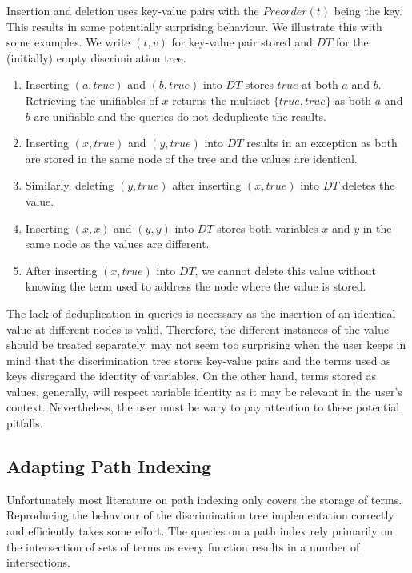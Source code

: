 Insertion and deletion uses key-value pairs with the $Preorder(t)$ being the key. This results in some potentially surprising behaviour. We illustrate this with some examples. We write $(t, v)$ for key-value pair stored and $DT$ for the (initially) empty discrimination tree.

\begin{enumerate}
  \item \label{cave1} Inserting $(a,true)$ and $(b,true)$ into $DT$ stores $true$ at both $a$ and $b$. Retrieving the unifiables of $x$ returns the multiset $\{true, true\}$ as both $a$ and $b$ are unifiable and the queries do not deduplicate the results.
  \item \label{cave2} Inserting $(x,true)$ and $(y,true)$ into $DT$ results in an exception as both are stored in the same node of the tree and the values are identical.
  \item \label{cave4} Similarly, deleting $(y,true)$ after inserting $(x,true)$ into $DT$ deletes the value.
  \item \label{cave3} Inserting $(x,x)$ and $(y,y)$ into $DT$ stores both variables $x$ and $y$ in the same node as the values are different.
  \item \label{cave5} After inserting $(x,true)$ into $DT$, we cannot delete this value without knowing the term used to address the node where the value is stored.
\end{enumerate}

The lack of deduplication in queries is necessary as the insertion of an identical value at different nodes is valid. Therefore, the different instances of the value should be treated separately.
 may not seem too surprising when the user keeps in mind that the discrimination tree stores key-value pairs and the terms used as keys disregard the identity of variables. On the other hand, terms stored as values, generally, will respect variable identity as it may be relevant in the user's context. Nevertheless, the user must be wary to pay attention to these potential pitfalls.

\subsection{Adapting Path Indexing}
Unfortunately most literature \cite{noauthor_path-indexing_nodate, mccune_experiments_1992-1, carbonell_set-based_1995} on path indexing only covers the storage of terms. Reproducing the behaviour of the discrimination tree implementation correctly and efficiently takes some effort. The queries on a path index rely primarily on the intersection of sets of terms as every function results in a number of intersections.

